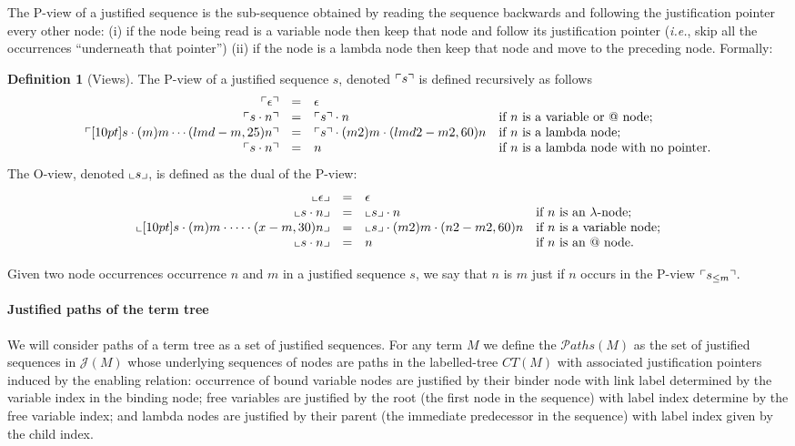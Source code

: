\documentclass{article}
\makeatletter
\theoremstyle{definition}
\newtheorem{definition}{Definition}[section]
\newcommand{\ctree}{CT} %
\newcommand\pathset{{\mathcal{P}aths}} %
\renewcommand\ie{{\it i.e.\@\xspace}}
\def\justseqset{\mathcal{J}}
\makeatother
\begin{document}
The P-view of a justified sequence is the sub-sequence obtained by reading the sequence backwards
and following the justification pointer every other node: (i) if the node being read is a variable node then keep that node and follow its justification pointer (\ie, skip all the occurrences ``underneath that pointer'') (ii) if the node is a lambda node then keep that node and move to the preceding node. Formally:
\begin{definition}[Views]
\label{def:views}
The P-view of a justified sequence $s$, denoted $\ulcorner s \urcorner$ is defined recursively  as follows
$$\begin{array}{rcll}
 \pview{\epsilon} &=&  \epsilon \\
 \pview{s \cdot n }  &=&  \pview{s} \cdot n
    & \mbox{if $n$ is a variable or $@$ node;}
    \\
 \pview{\Pstr[10pt]{ s \cdot (m){m} \cdots (lmd-m,25){n}}} &=&
        \Pstr{ \pview{s} \cdot (m2){m} \cdot (lmd2-m2,60){n} }
    & \mbox{if $n$ is a lambda node;}
    \\
 \pview{s \cdot n }  &=&  n & \mbox{if $n$ is a lambda node with no pointer.}
\end{array}$$
The O-view, denoted $\llcorner s \lrcorner$, is defined as the dual of the P-view:
$$\begin{array}{rcll}
 \oview{\epsilon} &=&  \epsilon \\
 \oview{s \cdot n }  &=&  \oview{s} \cdot n
    & \mbox{if $n$ is an $\lambda$-node;}
    \\
 \oview{\Pstr[10pt]{s \cdot (m){m} \cdot \cdots \cdot (x-m,30){n}}} &=&
    \Pstr{ \oview{s} \cdot (m2){m} \cdot (n2-m2,60){n} }
    & \mbox{if $n$ is a variable node;}
    \\
 \oview{s \cdot n }  &=&  n
    & \mbox{if $n$ is an $@$ node.}
\end{array}$$
\end{definition}

Given two node occurrences occurrence $n$ and $m$ in a justified sequence $s$, we say that $n$ is  $m$ just if $n$ occurs in the P-view $\ulcorner s_{\leq m} \urcorner$.

\paragraph{Justified paths of the term tree}

We will consider paths of a term tree as a set of justified sequences. For any term $M$ we define the  $\pathset(M)$ as the set of justified sequences in $\justseqset(M)$ whose underlying sequences of nodes are paths in the labelled-tree $\ctree(M)$ with associated justification pointers induced by the enabling relation: occurrence of bound variable nodes are justified by their binder node with link label determined by the variable index in the binding node; free variables are justified by the root (the first node in the sequence) with label index determine by the free variable index; and lambda nodes are justified by their parent (the immediate predecessor in the sequence) with label index given by the child index.
\end{document}
